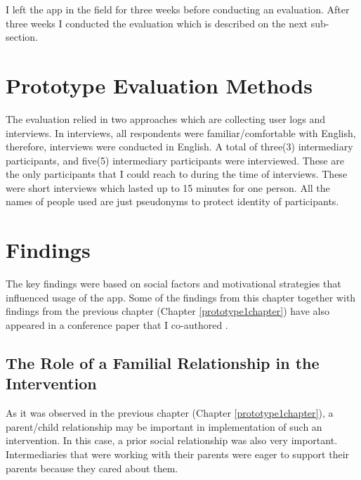 I left the app in the field for three weeks before conducting an evaluation. After three weeks I conducted the evaluation which is described on the next sub-section.
\section{Prototype Evaluation Methods}
The evaluation relied in two approaches which are collecting user logs and interviews. In interviews, all respondents were familiar/comfortable with English, therefore, interviews were conducted in English. A total of three(3) intermediary participants, and five(5) intermediary participants were interviewed. These are the only participants that I could reach to during the time of interviews. These were short interviews which lasted up to 15 minutes for one person. All the names of people used are just pseudonyms to protect identity of participants. 
\section{Findings}
The key findings were based on social factors and motivational strategies that influenced usage of the app. Some of the findings from this chapter together with findings from the previous chapter (Chapter \ref{prototype1chapter}) have also appeared in a conference paper that I co-authored \citep{katule2016leveraging}.
\subsection{The Role of a Familial Relationship in the Intervention}
As it was observed in the previous chapter (Chapter \ref{prototype1chapter}), a parent/child relationship may be important in implementation of such an intervention. In this case, a prior social relationship was also very important. Intermediaries that were working with their parents were eager to support their parents because they cared about them. 

